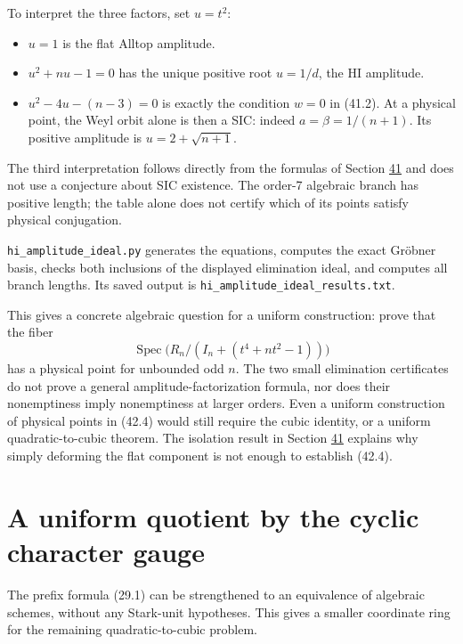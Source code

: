 \documentclass[11pt,reqno]{amsart}
\theoremstyle{plain}
\begin{document}
To interpret the three factors, set \(u=t^2\):

\begin{itemize}
\item \(u=1\) is the flat Alltop amplitude.
\item \(u^2+nu-1=0\) has the unique positive root \(u=1/d\), the HI
amplitude.
\item \(u^2-4u-(n-3)=0\) is exactly the condition \(w=0\) in (41.2).
At a physical point, the Weyl orbit alone is then a SIC: indeed
\(a=\beta=1/(n+1)\). Its positive amplitude is
\(u=2+\sqrt{n+1}\).
\end{itemize}

The third interpretation follows directly from the formulas of Section
\hyperref[sec:41]{41} and does not use a conjecture about SIC existence. The order-7
algebraic branch has positive length; the table alone does not certify
which of its points satisfy physical conjugation.

\texttt{hi\_\allowbreak amplitude\_\allowbreak ideal.py} generates the equations, computes the exact
Gr\"obner basis, checks both inclusions of the displayed elimination
ideal, and computes all branch lengths. Its saved output is
\texttt{hi\_\allowbreak amplitude\_\allowbreak ideal\_\allowbreak results.txt}.

This gives a concrete algebraic question for a uniform construction:
prove that the fiber
\begin{equation*}
 \operatorname{Spec}\bigl(R_n/(I_n+(t^4+nt^2-1))\bigr)
 \tag{42.4}
\end{equation*}
has a physical point for unbounded odd \(n\). The two small elimination
certificates do not prove a general amplitude-factorization formula,
nor does their nonemptiness imply nonemptiness at larger orders.
Even a uniform construction of physical points in (42.4) would still
require the cubic identity, or a uniform quadratic-to-cubic theorem.
The isolation result in Section \hyperref[sec:41]{41} explains why simply deforming the
flat component is not enough to establish (42.4).

\section{A uniform quotient by the cyclic character gauge}\label{sec:43}

The prefix formula (29.1) can be strengthened to an equivalence of
algebraic schemes, without any Stark-unit hypotheses. This gives a
smaller coordinate ring for the remaining quadratic-to-cubic problem.
\end{document}
